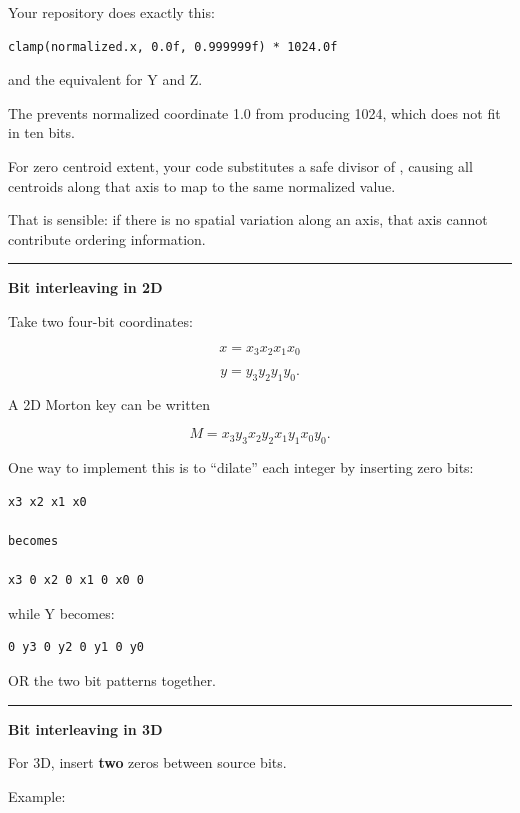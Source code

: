 Your repository does exactly this:

\begin{verbatim}
clamp(normalized.x, 0.0f, 0.999999f) * 1024.0f
\end{verbatim}

and the equivalent for Y and Z.

The  prevents normalized coordinate 1.0 from producing 1024, which does not fit in ten bits.

For zero centroid extent, your code substitutes a safe divisor of , causing all centroids along that axis to map to the same normalized value.

That is sensible: if there is no spatial variation along an axis, that axis cannot contribute ordering information.

\begin{center}\rule{0.5\linewidth}{0.5pt}\end{center}

\textbf{Bit interleaving in 2D}

Take two four-bit coordinates:

\[
x=x_3x_2x_1x_0
\]

\[
y=y_3y_2y_1y_0.
\]

A 2D Morton key can be written

\[
M=
x_3y_3x_2y_2x_1y_1x_0y_0.
\]

One way to implement this is to ``dilate'' each integer by inserting zero bits:

\begin{verbatim}
x3 x2 x1 x0

becomes

x3 0 x2 0 x1 0 x0 0
\end{verbatim}

while Y becomes:

\begin{verbatim}
0 y3 0 y2 0 y1 0 y0
\end{verbatim}

OR the two bit patterns together.

\begin{center}\rule{0.5\linewidth}{0.5pt}\end{center}

\textbf{Bit interleaving in 3D}

For 3D, insert \textbf{two} zeros between source bits.

Example:

